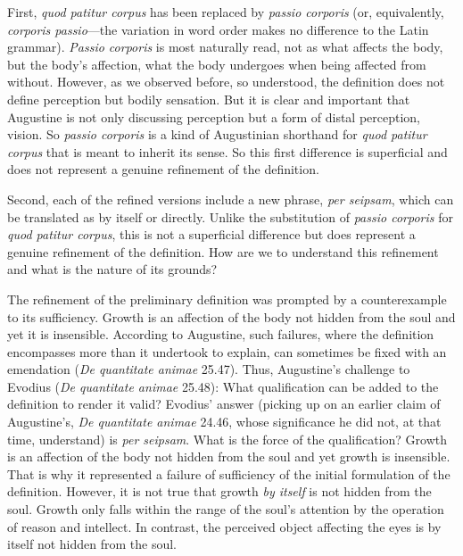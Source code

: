 \documentclass[12pt]{article}
\begin{document}
First, \emph{quod patitur corpus} has been replaced by \emph{passio corporis} (or, equivalently, \emph{corporis passio}---the variation in word order makes no difference to the Latin grammar). \emph{Passio corporis} is most naturally read, not as what affects the body, but the body's affection, what the body undergoes when being affected from without. However, as we observed before, so understood, the definition does not define perception but bodily sensation. But it is clear and important that Augustine is not only discussing perception but a form of distal perception, vision. So \emph{passio corporis} is a kind of Augustinian shorthand for \emph{quod patitur corpus} that is meant to inherit its sense. So this first difference is superficial and does not represent a genuine refinement of the definition.

Second, each of the refined versions include a new phrase, \emph{per seipsam}, which can be translated as by itself or directly. Unlike the substitution of \emph{passio corporis} for \emph{quod patitur corpus}, this is not a superficial difference but does represent a genuine refinement of the definition. How are we to understand this refinement and what is the nature of its grounds?

The refinement of the preliminary definition was prompted by a counterexample to its sufficiency. Growth is an affection of the body not hidden from the soul and yet it is insensible. According to Augustine, such failures, where the definition encompasses more than it undertook to explain, can sometimes be fixed with an emendation (\emph{De quantitate animae} 25.47). Thus, Augustine's challenge to Evodius (\emph{De quantitate animae} 25.48): What qualification can be added to the definition to render it valid? Evodius' answer (picking up on an earlier claim of Augustine's, \emph{De quantitate animae} 24.46, whose significance he did not, at that time, understand) is \emph{per seipsam}. What is the force of the qualification? Growth is an affection of the body not hidden from the soul and yet growth is insensible. That is why it represented a failure of sufficiency of the initial formulation of the definition. However, it is not true that growth \emph{by itself} is not hidden from the soul. Growth only falls within the range of the soul's attention by the operation of reason and intellect. In contrast, the perceived object affecting the eyes is by itself not hidden from the soul.
\end{document}
